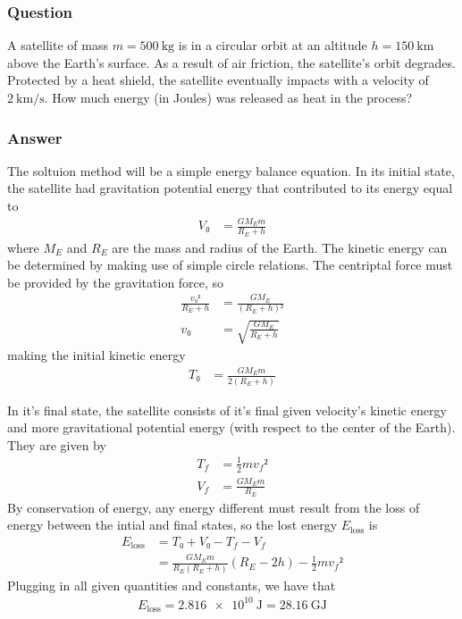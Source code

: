 \subsubsection{Question}

A satellite of mass $m = \SI{500}{\kg}$ is in a circular orbit at an
altitude $h = \SI{150}{\km}$ above the Earth's surface. As a result of air
friction, the satellite's orbit degrades. Protected by a heat shield, the
satellite eventually impacts with a velocity of $\SI{2}{\km\per\s}$. How
much energy (in Joules) was released as heat in the process?

\subsubsection{Answer}

The soltuion method will be a simple energy balance equation. In its initial
state, the satellite had gravitation potential energy that contributed to
its energy equal to
\begin{align*}
    V₀ &= \frac{GM_E m}{R_E + h}
\end{align*}
where $M_E$ and $R_E$ are the mass and radius of the Earth. The kinetic energy
can be determined by making use of simple circle relations. The centriptal
force must be provided by the gravitation force, so
\begin{align*}
    \frac{{v₀}²}{R_E + h} &= \frac{GM_E}{(R_E + h)²} \\
    v₀ &= \sqrt{\frac{GM_E}{R_E + h}}
\end{align*}
making the initial kinetic energy
\begin{align*}
    T₀ &= \frac{GM_E m}{2(R_E + h)}
\end{align*}

In it's final state, the satellite consists of it's final given velocity's
kinetic energy and more gravitational potential energy (with respect to the
center of the Earth). They are given by
\begin{align*}
    T_f &= \frac 12 m{v_f}² \\
    V_f &= \frac{GM_E m}{R_E}
\end{align*}
By conservation of energy, any energy different must result from the loss
of energy between the intial and final states, so the lost energy
$E_\mathrm{loss}$ is
\begin{align*}
    E_\mathrm{loss} &= T₀ + V₀ - T_f - V_f \\
    {} &= \frac{GM_E m}{R_E(R_E + h)}(R_E - 2h) - \frac 12 m{v_f}²
\end{align*}
Plugging in all given quantities and constants, we have that
\begin{align}
    \boxed{
    E_\mathrm{loss} = \SI{2.816e10}{\J} = \SI{28.16}{\giga\J}
    }
\end{align}

